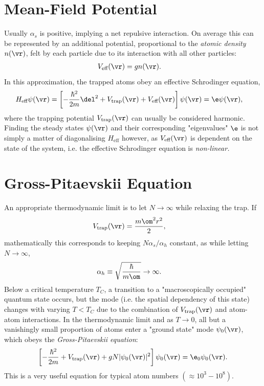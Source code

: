 \documentclass[a4paper, 11pt, normalem]{report}
\begin{document}
\section{Mean-Field Potential}
Usually $\alpha_s$ is positive, implying a net repulsive interaction.
On average this can be represented by an additional potential, proportional to the \emph{atomic density} $n(\vr)$, felt by each particle due to its interaction with all other particles:
\begin{align}
    V_{\text{eff}}(\vr) &= gn(\vr).
\end{align}
In this approximation, the trapped atoms obey an effective Schrodinger equation,
\begin{align}
    H_{\text{eff}}\psi(\vr) &= \left[-\frac{\hbar^2}{2m}\del^2 + V_{\text{trap}}(\vr) + V_{\text{eff}}(\vr)\right] \psi(\vr) = \e\psi(\vr),
\end{align}
where the trapping potential $V_{\text{trap}}(\vr)$ can usually be considered harmonic.
Finding the steady states $\psi(\vr)$ and their corresponding "eigenvalues" $\e$ is not simply a matter of diagonalising $H_{\text{eff}}$ however, as $V_{\text{eff}}(\vr)$ is dependent on the state of the system, i.e. the effective Schrodinger equation is \emph{non-linear.}

\section{Gross-Pitaevskii Equation}
An appropriate thermodynamic limit is to let $N\to\infty$ while relaxing the trap.
If
\begin{align}
    V_{\text{trap}}(\vr) &= \frac{m\om^2 r^2}{2},
\end{align}
mathematically this corresponds to keeping $N\alpha_s/\alpha_h$ constant, as while letting $N\to\infty$,
\begin{align}
    \alpha_h &\equiv \sqrt{\frac{\hbar}{m\om}}\to\infty.
\end{align}
Below a critical temperature $T_C$, a transition to a "macroscopically occupied" quantum state occurs, but the mode (i.e. the spatial dependency of this state) changes with varying $T<T_C$ due to the combination of $V_{\text{trap}}(\vr)$ and atom-atom interactions.
In the thermodynamic limit and as $T\to0$, all but a vanishingly small proportion of atoms enter a "ground state" mode $\psi_0(\vr)$, which obeys the \emph{Gross-Pitaevskii equation}:
\begin{align}
    \left[-\frac{\hbar^2}{2m}+V_{\text{trap}}(\vr)+gN|\psi_0(\vr)|^2\right]\psi_0(\vr) = \e_0\psi_0(\vr).
\end{align}
This is a very useful equation for typical atom numbers $(\approx 10^3-10^8)$.
\end{document}
